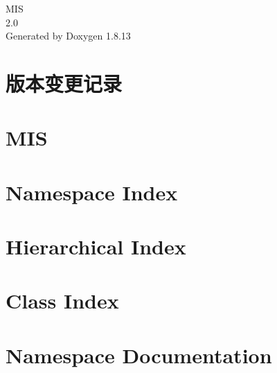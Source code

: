\documentclass[twoside]{book}
\newcommand{\+}{\discretionary{\mbox{\scriptsize$\hookleftarrow$}}{}{}}
\newcommand{\clearemptydoublepage}{%
  \newpage{\pagestyle{empty}\cleardoublepage}%
}
\begin{document}
\hypersetup{pageanchor=false,
             bookmarksnumbered=true,
             pdfencoding=unicode
            }
\begin{titlepage}
\vspace*{7cm}
\begin{center}%
{\Large M\+IS \\[1ex]\large 2.\+0 }\\
\vspace*{1cm}
{\large Generated by Doxygen 1.8.13}\\
\end{center}
\end{titlepage}
\clearemptydoublepage
{}
\tableofcontents
\clearemptydoublepage
{}
\hypersetup{pageanchor=true}

\chapter{版本变更记录}
\label{md_Muon_Imaging_Algorithm_readme}

\chapter{M\+IS}
\label{md_README}

\chapter{Namespace Index}

\chapter{Hierarchical Index}

\chapter{Class Index}

\chapter{Namespace Documentation}





\end{document}
